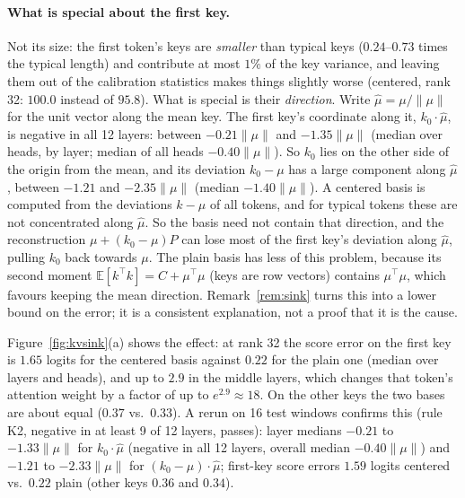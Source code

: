 \documentclass[10pt]{article}
\theoremstyle{plain}
\theoremstyle{definition}
\theoremstyle{remark}
\newcommand{\E}{\mathbb{E}}
\newcommand{\T}{^{\top}}
\newcommand{\rl}[1]{\textsf{#1}}%
\begin{document}
\paragraph{What is special about the first key.}
Not its size: the first token's keys are \emph{smaller} than typical keys ($0.24$--$0.73$ times the typical length) and contribute at most $1\%$ of the key variance, and leaving them out of the calibration statistics makes things slightly worse (centered, rank 32: $100.0$ instead of $95.8$). What is special is their \emph{direction}. Write $\hat\mu=\mu/\lVert\mu\rVert$ for the unit vector along the mean key. The first key's coordinate along it, $k_0\cdot\hat\mu$, is negative in all 12 layers: between $-0.21\lVert\mu\rVert$ and $-1.35\lVert\mu\rVert$ (median over heads, by layer; median of all heads $-0.40\lVert\mu\rVert$). So $k_0$ lies on the other side of the origin from the mean, and its deviation $k_0-\mu$ has a large component along $\hat\mu$, between $-1.21$ and $-2.35\lVert\mu\rVert$ (median $-1.40\lVert\mu\rVert$). A centered basis is computed from the deviations $k-\mu$ of all tokens, and for typical tokens these are not concentrated along $\hat\mu$. So the basis need not contain that direction, and the reconstruction $\mu+(k_0-\mu)P$ can lose most of the first key's deviation along $\hat\mu$, pulling $k_0$ back towards $\mu$. The plain basis has less of this problem, because its second moment $\E[k\T k]=C+\mu\T\mu$ (keys are row vectors) contains $\mu\T\mu$, which favours keeping the mean direction. Remark~\ref{rem:sink} turns this into a lower bound on the error; it is a consistent explanation, not a proof that it is the cause.

Figure~\ref{fig:kvsink}(a) shows the effect: at rank 32 the score error on the first key is $1.65$ logits for the centered basis against $0.22$ for the plain one (median over layers and heads), and up to $2.9$ in the middle layers, which changes that token's attention weight by a factor of up to $e^{2.9}\approx18$. On the other keys the two bases are about equal ($0.37$ vs.\ $0.33$). A rerun on 16 test windows confirms this (rule \rl{K2}, negative in at least 9 of 12 layers, passes): layer medians $-0.21$ to $-1.33\lVert\mu\rVert$ for $k_0\cdot\hat\mu$ (negative in all 12 layers, overall median $-0.40\lVert\mu\rVert$) and $-1.21$ to $-2.33\lVert\mu\rVert$ for $(k_0-\mu)\cdot\hat\mu$; first-key score errors $1.59$ logits centered vs.\ $0.22$ plain (other keys $0.36$ and $0.34$).
\end{document}
